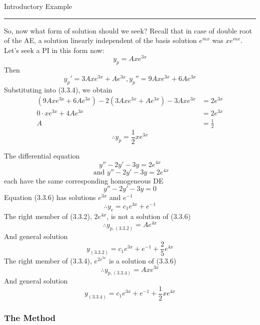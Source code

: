 \begin{example}{Introductory Example}{}
\rule{4in}{0.25pt}

So, now what form of solution should we seek? Recall that in case of double root of the AE, a solution linearly independent of the basis solution $e^{mx}$ was $xe^{mx}$. Let's seek a PI in this form now:
\begin{equation}
    y_p = Axe^{3x}
\end{equation}
Then \[
    y_p' = 3Axe^{3x} + Ae^{3x}, y_p'' = 9Axe^{3x} + 6Ae^{3x}
\]
Substituting into (3.3.4), we obtain
\begin{align*}
    (9Axe^{3x} + 6Ae^{3x}) - 2(3Axe^{3x} + Ae^{3x}) - 3Axe^{3x} &= 2e^{3x} \\
    0 \cdot xe^{3x} + 4Ae^{3x} &= 2e^{3x} \\
    A &= \frac{1}{2}
\end{align*}
\[ \therefore y_p = \frac{1}{2}xe^{3x} \]
\end{example}

The differential equation
\begin{equation}\tag{3.3.2}
    y'' - 2y' - 3y = 2e^{4x}
\end{equation}
\begin{equation}\tag{3.3.4}
    \text{ and } y'' - 2y' - 3y = 2e^{4x}
\end{equation}
each have the same corresponding homogeneous DE
\begin{equation}\tag{3.3.6}
    y'' - 2y' - 3y = 0
\end{equation}
Equation (3.3.6) has solutions $e^{3x}$ and $e^{-1}$ \[
    \therefore y_c = c_1e^{3x} + e^{-1}
\]
The right member of (3.3.2), $2e^{4x}$, is not a solution of (3.3.6)
\begin{equation}
    \therefore y_{p,(3.3.2)} = Ae^{4x}
\end{equation}
And general solution \[
    y_{(3.3.2)} = c_1e^{3x} + e^{-1} + \frac{2}{5}e^{4x}
\]
The right member of (3.3.4), $e^{2e^{3x}}$ is a solution of (3.3.6)
\begin{equation}
    \therefore y_{p, (3.3.4)} = Axe^{3x}
\end{equation}
And general solution \[
    y_{(3.3.4)} = c_1e^{3x} + e^{-1} + \frac{1}{2}xe^{4x}
\]

\vspace{20pt}
\subsubsection{The Method}

